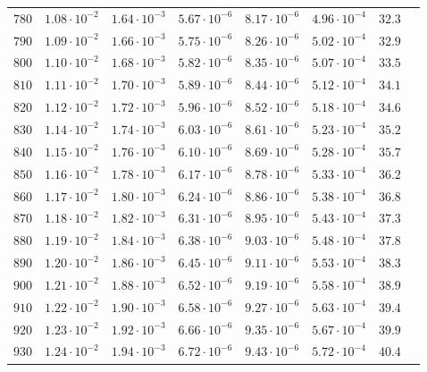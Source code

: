 \begin{table}
\begin{tabular}{lccccccc}
$780 $&$ 1.08\cdot 10^{-2} $&$ 1.64\cdot 10^{-3} $&$ 5.67\cdot 10^{-6} $&$ 8.17\cdot 10^{-6} $&$ 4.96\cdot 10^{-4} $&$ 32.3$\\
$790 $&$ 1.09\cdot 10^{-2} $&$ 1.66\cdot 10^{-3} $&$ 5.75\cdot 10^{-6} $&$ 8.26\cdot 10^{-6} $&$ 5.02\cdot 10^{-4} $&$ 32.9$\\
$800 $&$ 1.10\cdot 10^{-2} $&$ 1.68\cdot 10^{-3} $&$ 5.82\cdot 10^{-6} $&$ 8.35\cdot 10^{-6} $&$ 5.07\cdot 10^{-4} $&$ 33.5$\\
$810 $&$ 1.11\cdot 10^{-2} $&$ 1.70\cdot 10^{-3} $&$ 5.89\cdot 10^{-6} $&$ 8.44\cdot 10^{-6} $&$ 5.12\cdot 10^{-4} $&$ 34.1$\\
$820 $&$ 1.12\cdot 10^{-2} $&$ 1.72\cdot 10^{-3} $&$ 5.96\cdot 10^{-6} $&$ 8.52\cdot 10^{-6} $&$ 5.18\cdot 10^{-4} $&$ 34.6$\\
$830 $&$ 1.14\cdot 10^{-2} $&$ 1.74\cdot 10^{-3} $&$ 6.03\cdot 10^{-6} $&$ 8.61\cdot 10^{-6} $&$ 5.23\cdot 10^{-4} $&$ 35.2$\\
$840 $&$ 1.15\cdot 10^{-2} $&$ 1.76\cdot 10^{-3} $&$ 6.10\cdot 10^{-6} $&$ 8.69\cdot 10^{-6} $&$ 5.28\cdot 10^{-4} $&$ 35.7$\\
$850 $&$ 1.16\cdot 10^{-2} $&$ 1.78\cdot 10^{-3} $&$ 6.17\cdot 10^{-6} $&$ 8.78\cdot 10^{-6} $&$ 5.33\cdot 10^{-4} $&$ 36.2$\\
$860 $&$ 1.17\cdot 10^{-2} $&$ 1.80\cdot 10^{-3} $&$ 6.24\cdot 10^{-6} $&$ 8.86\cdot 10^{-6} $&$ 5.38\cdot 10^{-4} $&$ 36.8$\\
$870 $&$ 1.18\cdot 10^{-2} $&$ 1.82\cdot 10^{-3} $&$ 6.31\cdot 10^{-6} $&$ 8.95\cdot 10^{-6} $&$ 5.43\cdot 10^{-4} $&$ 37.3$\\
$880 $&$ 1.19\cdot 10^{-2} $&$ 1.84\cdot 10^{-3} $&$ 6.38\cdot 10^{-6} $&$ 9.03\cdot 10^{-6} $&$ 5.48\cdot 10^{-4} $&$ 37.8$\\
$890 $&$ 1.20\cdot 10^{-2} $&$ 1.86\cdot 10^{-3} $&$ 6.45\cdot 10^{-6} $&$ 9.11\cdot 10^{-6} $&$ 5.53\cdot 10^{-4} $&$ 38.3$\\
$900 $&$ 1.21\cdot 10^{-2} $&$ 1.88\cdot 10^{-3} $&$ 6.52\cdot 10^{-6} $&$ 9.19\cdot 10^{-6} $&$ 5.58\cdot 10^{-4} $&$ 38.9$\\
$910 $&$ 1.22\cdot 10^{-2} $&$ 1.90\cdot 10^{-3} $&$ 6.58\cdot 10^{-6} $&$ 9.27\cdot 10^{-6} $&$ 5.63\cdot 10^{-4} $&$ 39.4$\\
$920 $&$ 1.23\cdot 10^{-2} $&$ 1.92\cdot 10^{-3} $&$ 6.66\cdot 10^{-6} $&$ 9.35\cdot 10^{-6} $&$ 5.67\cdot 10^{-4} $&$ 39.9$\\
$930 $&$ 1.24\cdot 10^{-2} $&$ 1.94\cdot 10^{-3} $&$ 6.72\cdot 10^{-6} $&$ 9.43\cdot 10^{-6} $&$ 5.72\cdot 10^{-4} $&$ 40.4$\\

\end{tabular}
\end{table}
